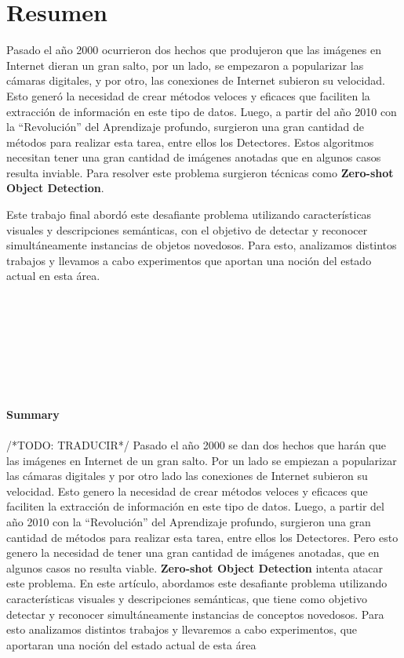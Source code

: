 \documentclass[12pt,twosided]{book}
\begin{document}
\chapter*{Resumen}

\pagestyle{plain}
Pasado el año 2000 ocurrieron dos hechos que produjeron que las imágenes en Internet dieran un gran salto, por un lado, se empezaron a popularizar las cámaras digitales, y por otro, las conexiones de Internet subieron su velocidad. Esto generó la necesidad de crear métodos veloces y eficaces que faciliten la extracción de información en este tipo de datos. Luego, a partir del año 2010 con la  ``Revolución'' del Aprendizaje profundo, surgieron una gran cantidad de métodos para realizar esta tarea, entre ellos los Detectores. Estos algoritmos necesitan tener una gran cantidad de imágenes anotadas que en algunos casos resulta inviable. Para resolver este problema surgieron técnicas como \textbf{Zero-shot Object Detection}. 

Este trabajo final abordó este desafiante problema utilizando características visuales y descripciones semánticas, con el objetivo de detectar y reconocer simultáneamente instancias de objetos novedosos. Para esto, analizamos distintos trabajos y llevamos a cabo experimentos que aportan una noción del estado actual en esta área. \\\\\\\\\\\\\\\\\\
{\huge\textbf{Summary}}\\\\

/*TODO: TRADUCIR*/
Pasado el año 2000 se dan dos hechos que harán que las imágenes en Internet de un gran salto. Por un lado se empiezan a popularizar las cámaras digitales y por otro lado las conexiones de Internet subieron su velocidad. Esto genero la necesidad de crear métodos veloces y eficaces que faciliten la extracción de información en este tipo de datos. Luego, a partir del año 2010 con la  ``Revolución'' del Aprendizaje profundo, surgieron una gran cantidad de métodos para realizar esta tarea, entre ellos los Detectores. Pero esto genero la necesidad de tener una gran cantidad de imágenes anotadas, que en algunos casos no resulta viable. \textbf{Zero-shot Object Detection} intenta atacar este problema. En este artículo, abordamos este desafiante problema utilizando características visuales y descripciones semánticas, que tiene como objetivo detectar y reconocer simultáneamente instancias de conceptos novedosos. Para esto analizamos distintos trabajos y llevaremos a cabo experimentos, que aportaran una noción del estado actual de esta área
\end{document}
